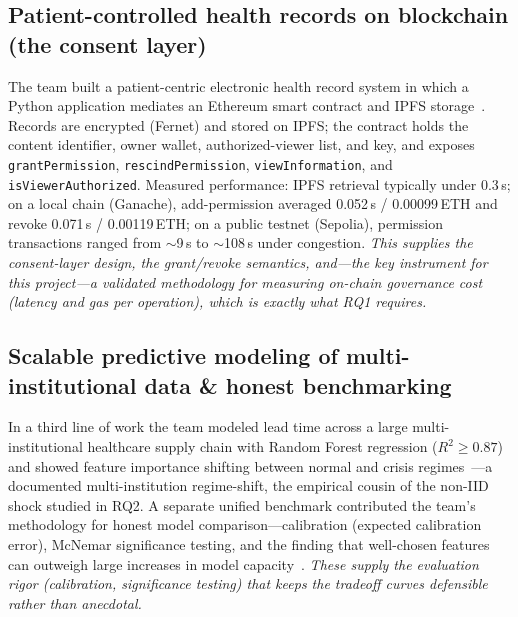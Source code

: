 \documentclass[11pt]{article}
\begin{document}
\subsection{Patient-controlled health records on blockchain (the consent layer)}
The team built a patient-centric electronic health record system in which a
Python application mediates an Ethereum smart contract and IPFS
storage~\cite{ehr}. Records are encrypted (Fernet) and stored on IPFS; the
contract holds the content identifier, owner wallet, authorized-viewer list, and
key, and exposes \texttt{grantPermission}, \texttt{rescindPermission},
\texttt{viewInformation}, and \texttt{isViewerAuthorized}. Measured performance:
IPFS retrieval typically under 0.3\,s; on a local chain (Ganache), add-permission
averaged 0.052\,s / 0.00099\,ETH and revoke 0.071\,s / 0.00119\,ETH; on a public
testnet (Sepolia), permission transactions ranged from $\sim$9\,s to
$\sim$108\,s under congestion. \emph{This supplies the consent-layer design, the
grant/revoke semantics, and---the key instrument for this project---a validated
methodology for measuring on-chain governance cost (latency and gas per
operation), which is exactly what RQ1 requires.}

\subsection{Scalable predictive modeling of multi-institutional data \& honest benchmarking}
In a third line of work the team modeled lead time across a large
multi-institutional healthcare supply chain with Random Forest regression
($R^2 \ge 0.87$) and showed feature importance shifting between normal and crisis
regimes~\cite{nhan2024optimizing}---a documented multi-institution regime-shift, the
empirical cousin of the non-IID shock studied in RQ2. A separate unified benchmark
contributed the team's methodology for honest model comparison---calibration
(expected calibration error), McNemar significance testing, and the finding that
well-chosen features can outweigh large increases in model
capacity~\cite{tennis}. \emph{These supply the evaluation rigor (calibration,
significance testing) that keeps the tradeoff curves defensible rather than
anecdotal.}
\end{document}
